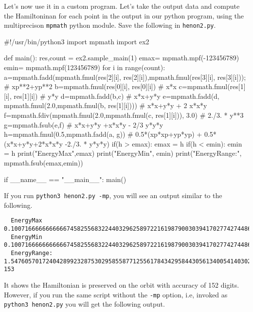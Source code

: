 \documentclass[10pt]{article}
\theoremstyle{remark}
\begin{document}
 Let's now use it in a custom program. Let's
 take the output data and compute the Hamiltoninan for each point in
 the output in our python program, using the multiprecison
 \verb+mpmath+ python module. Save the following in \verb+henon2.py+.

{\footnotesize
\begin{code}[title={File {\tt henon2.py}}]
#!/usr/bin/python3
import mpmath
import ex2

def main():
   res,count = ex2.sample_main(1)
   emax= mpmath.mpf(-123456789)
   emin= mpmath.mpf(123456789)
   for i in range(count):
       a=mpmath.fadd(mpmath.fmul(res[2][i], res[2][i]),mpmath.fmul(res[3][i], res[3][i])); # xp**2+yp**2
       b=mpmath.fmul(res[0][i], res[0][i])                             # x*x
       c=mpmath.fmul(res[1][i], res[1][i])                             # y*y
       d=mpmath.fadd(b,c)                                              # x*x+y*y
       e=mpmath.fadd(d, mpmath.fmul(2.0,mpmath.fmul(b, res[1][i])))    # x*x+y*y + 2 x*x*y
       f=mpmath.fdiv(mpmath.fmul(2.0,mpmath.fmul(c, res[1][i])), 3.0)  # 2./3. * y**3
       g=mpmath.fsub(e,f)                                              # x*x+y*y +x*x*y - 2/3 y*y*y
       h=mpmath.fmul(0.5,mpmath.fadd(a, g)) # 0.5*(xp*xp+yp*yp) + 0.5*(x*x+y*y+2*x*x*y -2./3. * y*y*y)
       if(h > emax):
          emax = h
       if(h < emin):
          emin = h
   print("EnergyMax",emax)
   print("EnergyMin", emin)
   print("EnergyRange:", mpmath.fsub(emax,emin))

if __name__ == "__main__":
    main()
\end{code}
}

If you run \verb+python3 henon2.py -mp+, you will see an output
similar to the following.

{\tiny
\begin{verbatim}
  EnergyMax 0.100716666666666674582556832244032962589722161987900303941702774274486085767382608671047985812496007221851735145333500578162325607885681696037257400651773
  EnergyMin 0.100716666666666674582556832244032962589722161987900303941702774274486085767382608671047985812496007221851735145333500578162325607885681696037257400651772
  EnergyRange: 1.54760570172404289923287530295855877125561784342958443056134005414030276490204954827425628975808876919751365767558599105158314107975925030205087920214036e-153
  \end{verbatim}
}

It shows the Hamiltonian is preserved on the orbit with accuracy of
 152 digits. However, if you run the same script without the \verb+-mp+
 option, i.e, invoked as \verb+python3 henon2.py+ you will get the following
 output.
\end{document}
